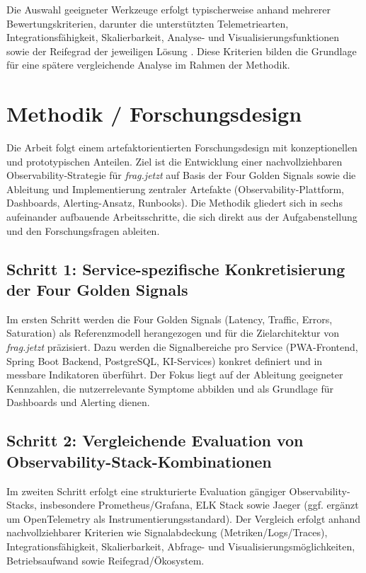 Die Auswahl geeigneter Werkzeuge erfolgt typischerweise anhand mehrerer Bewertungskriterien, darunter die unterstützten Telemetriearten, Integrationsfähigkeit, Skalierbarkeit, Analyse- und Visualisierungsfunktionen sowie der Reifegrad der jeweiligen Lösung \cite{giamattei2024monitoring}. Diese Kriterien bilden die Grundlage für eine spätere vergleichende Analyse im Rahmen der Methodik.



\section{Methodik / Forschungsdesign}

Die Arbeit folgt einem artefaktorientierten Forschungsdesign mit konzeptionellen und prototypischen Anteilen. Ziel ist die Entwicklung einer nachvollziehbaren Observability-Strategie für \emph{frag.jetzt} auf Basis der Four Golden Signals sowie die Ableitung und Implementierung zentraler Artefakte (Observability-Plattform, Dashboards, Alerting-Ansatz, Runbooks). Die Methodik gliedert sich in sechs aufeinander aufbauende Arbeitsschritte, die sich direkt aus der Aufgabenstellung und den Forschungsfragen ableiten.

\subsection{Schritt 1: Service-spezifische Konkretisierung der Four Golden Signals}
Im ersten Schritt werden die Four Golden Signals (Latency, Traffic, Errors, Saturation) als Referenzmodell herangezogen und für die Zielarchitektur von \emph{frag.jetzt} präzisiert. Dazu werden die Signalbereiche pro Service (PWA-Frontend, Spring Boot Backend, PostgreSQL, KI-Services) konkret definiert und in messbare Indikatoren überführt. Der Fokus liegt auf der Ableitung geeigneter Kennzahlen, die nutzerrelevante Symptome abbilden und als Grundlage für Dashboards und Alerting dienen.

\subsection{Schritt 2: Vergleichende Evaluation von Observability-Stack-Kombinationen}
Im zweiten Schritt erfolgt eine strukturierte Evaluation gängiger Observability-Stacks, insbesondere Prometheus/Grafana, ELK Stack sowie Jaeger (ggf. ergänzt um OpenTelemetry als Instrumentierungsstandard). Der Vergleich erfolgt anhand nachvollziehbarer Kriterien wie Signalabdeckung (Metriken/Logs/Traces), Integrationsfähigkeit, Skalierbarkeit, Abfrage- und Visualisierungsmöglichkeiten, Betriebsaufwand sowie Reifegrad/Ökosystem.

